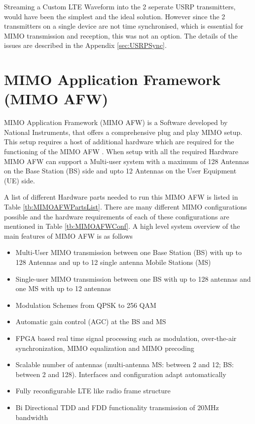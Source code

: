 Streaming a Custom LTE Waveform into the 2 seperate USRP transmitters, would have been the simplest and the ideal solution. However since the 2 transmitters on a single device are not time synchronised, which is essential for MIMO transmission and reception, this was not an option. The details of the issues are described in the Appendix \ref{sec:USRPSync}.

\section{MIMO Application Framework (MIMO AFW)}\label{sec:MIMOAFW}
MIMO Application Framework (MIMO AFW) is a Software developed by National Instruments, that offers a comprehensive plug and play MIMO setup. This setup requires a host of additional hardware which are required for the functioning of the MIMO AFW \cite{MIMOAFWGettingStarted}. When setup with all the required Hardware MIMO AFW can support a Multi-user system with a maximum of 128 Antennas on the Base Station (BS) side and upto 12 Antennas on the User Equipment (UE) side.

A list of different Hardware parts needed to run this MIMO AFW is listed in Table \ref{tb:MIMOAFWPartsList}. There are many different MIMO configurations possible and the hardware requirements of each of these configurations are mentioned in Table \ref{tb:MIMOAFWConf}. A high level system overview of the main features of MIMO AFW is as follows

\begin{itemize}

    \item Multi-User MIMO transmission between one Base Station (BS) with up to 128 Antennas and up to 12 single antenna Mobile Stations (MS)
    \item Single-user MIMO transmission between one BS with up to 128 antennas and one MS with up to 12 antennas
    \item Modulation Schemes from QPSK to 256 QAM
    \item Automatic gain control (AGC) at the BS and MS
    \item FPGA based real time signal processing such as modulation, over-the-air synchronization, MIMO equalization and MIMO precoding
    \item Scalable number of antennas (multi-antenna MS: between 2 and 12; BS: between 2 and 128). Interfaces and configuration adapt automatically
    \item Fully reconfigurable LTE like radio frame structure
    \item Bi Directional TDD and FDD functionality transmission of 20\si{\mega\hertz} bandwidth
\end{itemize}


